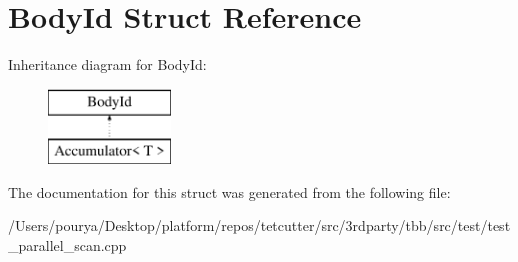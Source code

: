 \hypertarget{structBodyId}{}\section{Body\+Id Struct Reference}
\label{structBodyId}
Inheritance diagram for Body\+Id\+:\begin{figure}[H]
\begin{center}
\leavevmode
\includegraphics[height=2.000000cm]{structBodyId}
\end{center}
\end{figure}


The documentation for this struct was generated from the following file\+:\begin{DoxyCompactItemize}
\item 
/\+Users/pourya/\+Desktop/platform/repos/tetcutter/src/3rdparty/tbb/src/test/test\+\_\+parallel\+\_\+scan.\+cpp\end{DoxyCompactItemize}
